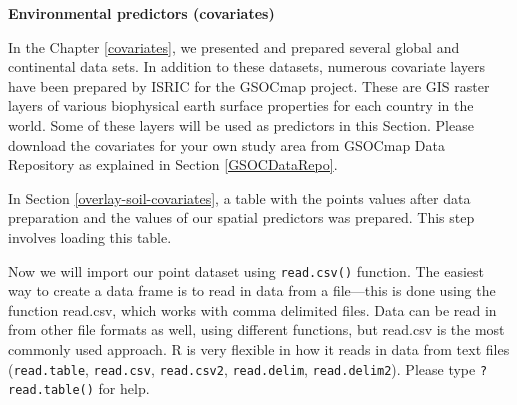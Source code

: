 \documentclass[10pt,b5paper,]{book}
\newenvironment{Shaded}{\begin{snugshade}}{\end{snugshade}}
\newcommand{\CommentTok}[1]{\textcolor[rgb]{0.56,0.35,0.01}{\textit{#1}}}
\newcommand{\KeywordTok}[1]{\textcolor[rgb]{0.13,0.29,0.53}{\textbf{#1}}}
\newcommand{\NormalTok}[1]{#1}
\newcommand{\OperatorTok}[1]{\textcolor[rgb]{0.81,0.36,0.00}{\textbf{#1}}}
\newcommand{\StringTok}[1]{\textcolor[rgb]{0.31,0.60,0.02}{#1}}
\theoremstyle{definition}
\theoremstyle{definition}
\theoremstyle{definition}
\theoremstyle{remark}
\begin{document}
\textbf{Environmental predictors (covariates)}

In the Chapter \ref{covariates}, we presented and prepared several
global and continental data sets. In addition to these datasets,
numerous covariate layers have been prepared by ISRIC for the GSOCmap
project. These are GIS raster layers of various biophysical earth
surface properties for each country in the world. Some of these layers
will be used as predictors in this Section. Please download the
covariates for your own study area from GSOCmap Data Repository as
explained in Section \ref{GSOCDataRepo}.

In Section \ref{overlay-soil-covariates}, a table with the points values
after data preparation and the values of our spatial predictors was
prepared. This step involves loading this table.

Now we will import our point dataset using \texttt{read.csv()} function.
The easiest way to create a data frame is to read in data from a
file---this is done using the function read.csv, which works with comma
delimited files. Data can be read in from other file formats as well,
using different functions, but read.csv is the most commonly used
approach. R is very flexible in how it reads in data from text files
(\texttt{read.table}, \texttt{read.csv}, \texttt{read.csv2},
\texttt{read.delim}, \texttt{read.delim2}). Please type
\texttt{?read.table()} for help.

\begin{Shaded}
\end{Shaded}
\end{document}
